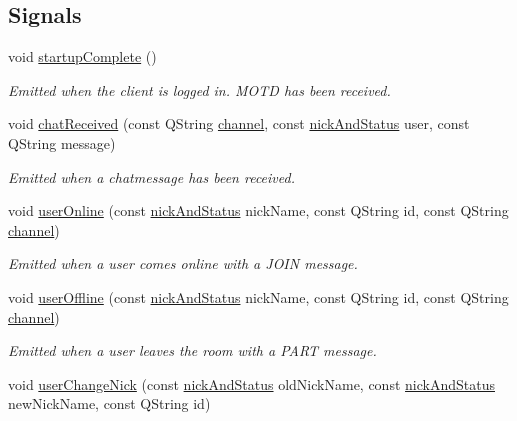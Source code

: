 \subsection*{Signals}
\begin{DoxyCompactItemize}
\item 
void \hyperlink{classserver_1_1irc_client_a5791e184ead2287b9c6e609e0edc45bb}{startup\-Complete} ()
\begin{DoxyCompactList}\small\item\em Emitted when the client is logged in. M\-O\-T\-D has been received. \end{DoxyCompactList}\item 
void \hyperlink{classserver_1_1irc_client_aa59470840fe4135454af200bf5259874}{chat\-Received} (const Q\-String \hyperlink{classserver_1_1irc_client_a01d41f735fe9f0227b72e794c060a798}{channel}, const \hyperlink{structserver_1_1nick_and_status}{nick\-And\-Status} user, const Q\-String message)
\begin{DoxyCompactList}\small\item\em Emitted when a chatmessage has been received. \end{DoxyCompactList}\item 
void \hyperlink{classserver_1_1irc_client_a1cd3512aac27b016945c5b66d0c777d1}{user\-Online} (const \hyperlink{structserver_1_1nick_and_status}{nick\-And\-Status} nick\-Name, const Q\-String id, const Q\-String \hyperlink{classserver_1_1irc_client_a01d41f735fe9f0227b72e794c060a798}{channel})
\begin{DoxyCompactList}\small\item\em Emitted when a user comes online with a J\-O\-I\-N message. \end{DoxyCompactList}\item 
void \hyperlink{classserver_1_1irc_client_a1ba37565db4acdfae3163d8d7217d9f2}{user\-Offline} (const \hyperlink{structserver_1_1nick_and_status}{nick\-And\-Status} nick\-Name, const Q\-String id, const Q\-String \hyperlink{classserver_1_1irc_client_a01d41f735fe9f0227b72e794c060a798}{channel})
\begin{DoxyCompactList}\small\item\em Emitted when a user leaves the room with a P\-A\-R\-T message. \end{DoxyCompactList}\item 
void \hyperlink{classserver_1_1irc_client_a566c94db09896197fdb8e982756b8c1e}{user\-Change\-Nick} (const \hyperlink{structserver_1_1nick_and_status}{nick\-And\-Status} old\-Nick\-Name, const \hyperlink{structserver_1_1nick_and_status}{nick\-And\-Status} new\-Nick\-Name, const Q\-String id)

\end{DoxyCompactItemize}
